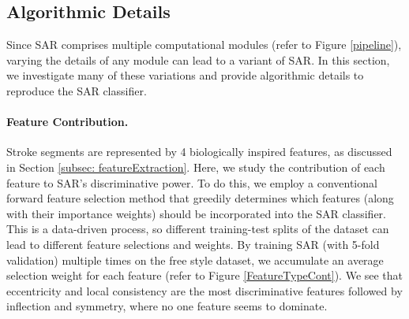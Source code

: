 \vspace{-2mm}
\subsection{Algorithmic Details} \label{subsec:variations}
\vspace{-2mm}
Since SAR comprises multiple computational modules (refer to Figure \ref{pipeline}), varying the details of any module can lead to a variant of SAR. In this section, we investigate many of these variations and provide algorithmic details to reproduce the SAR classifier.


\vspace{-2mm}
\paragraph{Feature Contribution.} Stroke segments are represented by 4 biologically inspired features, as discussed in Section \ref{subsec: featureExtraction}. Here, we study the contribution of each feature to SAR's discriminative power. To do this, we employ a conventional forward feature selection method that greedily determines which features (along with their importance weights) should be incorporated into the SAR classifier. This is a data-driven process, so different training-test splits of the dataset can lead to different feature selections and weights. By training SAR (with 5-fold validation) multiple times on the free style dataset, we accumulate an average selection weight for each feature (refer to Figure \ref{FeatureTypeCont}). We see that eccentricity and local consistency are the most discriminative features followed by inflection and symmetry, where no one feature seems to dominate.


